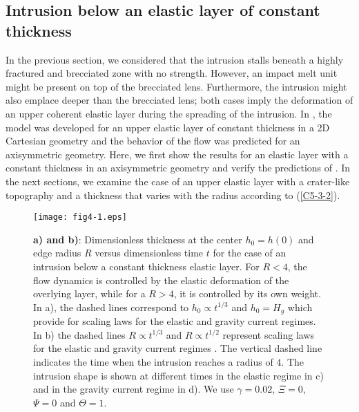 	
\subsection{Intrusion below an elastic layer of constant thickness}
\label{C5-Constant_Thickness}
		
In  the previous  section,  we considered  that  the intrusion  stalls
beneath   a   highly   fractured   and   brecciated   zone   with   no
strength. However, an impact melt unit  might be present on top of the
brecciated lens.  Furthermore, the intrusion might also emplace deeper
than the brecciated lens; both cases imply the deformation of an upper
coherent  elastic layer  during the  spreading of  the intrusion.   In
\citet{Michaut:2011kg}, the  model was developed for  an upper elastic
layer  of  constant thickness  in  a  2D  Cartesian geometry  and  the
behavior of the flow was predicted for an axisymmetric geometry. Here,
we  first show  the  results  for an  elastic  layer  with a  constant
thickness in  an axisymmetric geometry  and verify the  predictions of
\citet{Michaut:2011kg}. In the  next sections, we examine  the case of
an upper elastic  layer with a crater-like topography  and a thickness
that varies with the radius according to (\ref{C5-3-2}).

\begin{figure}[h!]
  \graphicspath{ {/Users/thorey/Documents/These/Submission/Article/FFC_JGR_2013/Paper_APRES_2nd_REVIEW/} }
  \centering
  \noindent\texttt{[image: fig4-1.eps]}
  \caption{\textbf{a) and  b)}: Dimensionless thickness at  the center
    $h_0=h(0)$ and edge  radius $R$ versus dimensionless  time $t$ for
    the  case  of an  intrusion  below  a constant  thickness  elastic
    layer. For $R<4$,  the flow dynamics is controlled  by the elastic
    deformation  of the  overlying layer,  while  for a  $R>4$, it  is
    controlled by its  own weight. In a), the  dashed lines correspond
    to  $h_{0}\propto t^{1/3}$  and $h_{0}  = H_g$  which provide  for
    scaling laws for  the elastic and gravity current  regimes.  In b)
    the  dashed  lines  $R\propto   t^{1/3}$  and  $R\propto  t^{1/2}$
    represent scaling laws for the elastic and gravity current regimes
    \citep{Michaut:2011kg}.   The vertical  dashed line  indicates the
    time when  the intrusion reaches  a radius of $4$.   The intrusion
    shape is shown at different times  in the elastic regime in c) and
    in  the  gravity current  regime  in  d).  We  use  $\gamma=0.02$,
    $\Xi=0$, $\Psi=0$ and $\Theta=1$. }
  \label{C5-fig4-1}
\end{figure}

